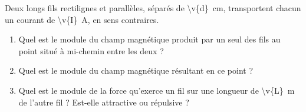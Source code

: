 Deux longs fils rectilignes et parallèles, séparés de \qty{\v{d}}{cm}, transportent chacun un courant de \qty{\v{I}}{A}, en sens contraires.

\begin{enumerate}[label=\alph*)]
    \item Quel est le module du champ magnétique produit par un seul des fils au point situé à mi-chemin entre les deux ?
    \item Quel est le module du champ magnétique résultant en ce point ?
    \item Quel est le module de la force qu'exerce un fil sur une longueur de \qty{\v{L}}{m} de l'autre fil ? Est-elle attractive ou répulsive ?
\end{enumerate}
